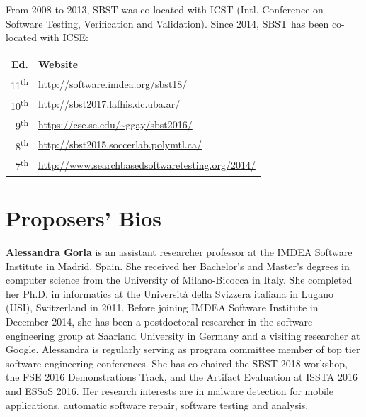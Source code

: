 \documentclass[10pt,conference]{IEEEtran}
\newcommand{\TODO}[1]{\textbf{\textcolor{ScarletRed}{[TODO: #1]}}\xspace}
\newcommand{\TODO}[1]{}
\begin{document}
From 2008 to 2013, SBST was co-located with ICST (Intl. Conference on
Software Testing, Verification and Validation). Since 2014, SBST has
been co-located with ICSE:%
\begin{table}[h]
\centering
\begin{tabular}{rl}\toprule
Ed. & Website \\\midrule
11\textsuperscript{th} & \url{http://software.imdea.org/sbst18/} \\
10\textsuperscript{th} & \url{http://sbst2017.lafhis.dc.uba.ar/} \\
9\textsuperscript{th}  & \url{https://cse.sc.edu/~ggay/sbst2016/} \\
8\textsuperscript{th}  & \url{http://sbst2015.soccerlab.polymtl.ca/} \\
7\textsuperscript{th}  & \url{http://www.searchbasedsoftwaretesting.org/2014/}\\\bottomrule
\end{tabular}
\end{table}


\section{Proposers' Bios}

{\bf Alessandra Gorla} is an assistant researcher professor at the
IMDEA Software Institute in Madrid, Spain. She received her Bachelor's
and Master's degrees in computer science from the University of
Milano-Bicocca in Italy. She completed her Ph.D. in informatics at the
Universit\`a della Svizzera italiana in Lugano (USI), Switzerland in
2011. Before joining IMDEA Software Institute in December 2014, she
has been a postdoctoral researcher in the software engineering group
at Saarland University in Germany and a visiting researcher at Google.
Alessandra is regularly serving as program committee member of top
tier software engineering conferences. She has co-chaired the SBST
2018 workshop, the FSE 2016 Demonstrations Track, and the Artifact
Evaluation at ISSTA 2016 and ESSoS 2016.  Her research interests are
in malware detection for mobile applications, automatic software
repair, software testing and analysis.
\end{document}
